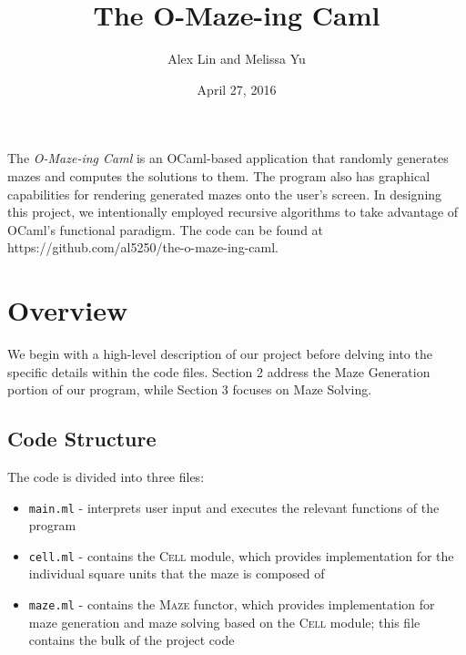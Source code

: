 \documentclass[11pt, margin=1in]{article}
\begin{document}
\title{The O-Maze-ing Caml}
\author{Alex Lin and Melissa Yu}
\date{April 27, 2016}
\maketitle

\setlength\parindent{0pt}

The \textit{O-Maze-ing Caml} is an OCaml-based application that randomly generates mazes and computes the solutions to them.  The program also has graphical capabilities for rendering generated mazes onto the user's screen.  In designing this project, we intentionally employed recursive algorithms to take advantage of OCaml's functional paradigm.  The code can be found at https://github.com/al5250/the-o-maze-ing-caml.  

\tableofcontents

\newpage
\section{Overview}

We begin with a high-level description of our project before delving into the specific details within the code files.  Section 2 address the Maze Generation portion of our program, while Section 3 focuses on Maze Solving.  

\subsection{Code Structure}  %
The code is divided into three files:
\begin{itemize}
\item \texttt{main.ml} - interprets user input and executes the relevant functions of the program  
\item \texttt{cell.ml} - contains the \textsc{Cell} module, which provides implementation for the individual square units that the maze is composed of
\item \texttt{maze.ml} - contains the \textsc{Maze} functor, which provides implementation for maze generation and maze solving based on the \textsc{Cell} module; this file contains the bulk of the project code   
\end{itemize} 
\end{document}
